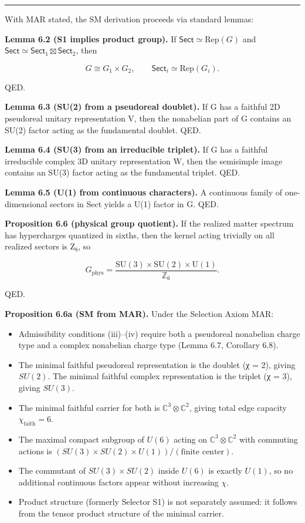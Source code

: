 \begin{center}\rule{0.5\linewidth}{0.5pt}\end{center}

With MAR stated, the SM derivation proceeds via standard lemmas:

\textbf{Lemma 6.2 (S1 implies product group).} If \(\mathsf{Sect} \simeq \mathrm{Rep}(G)\) and \(\mathsf{Sect} \simeq \mathsf{Sect}_1 \boxtimes \mathsf{Sect}_2\), then

\[
G \cong G_1 \times G_2,
\qquad
\mathsf{Sect}_i \simeq \mathrm{Rep}(G_i).
\]

QED.

\textbf{Lemma 6.3 (SU(2) from a pseudoreal doublet).} If G has a faithful 2D pseudoreal unitary representation V, then the nonabelian part of G contains an SU(2) factor acting as the fundamental doublet. QED.

\textbf{Lemma 6.4 (SU(3) from an irreducible triplet).} If G has a faithful irreducible complex 3D unitary representation W, then the semisimple image contains an SU(3) factor acting as the fundamental triplet. QED.

\textbf{Lemma 6.5 (U(1) from continuous characters).} A continuous family of one-dimensional sectors in Sect yields a U(1) factor in G. QED.

\textbf{Proposition 6.6 (physical group quotient).} If the realized matter spectrum has hypercharges quantized in sixths, then the kernel acting trivially on all realized sectors is Z₆, so

\[
G_{\mathrm{phys}} = \frac{\mathrm{SU}(3)\times \mathrm{SU}(2)\times \mathrm{U}(1)}{\mathbb Z_6}.
\]

QED.

\textbf{Proposition 6.6a (SM from MAR).} Under the Selection Axiom MAR:

\begin{itemize}
\tightlist
\item
  Admissibility conditions (iii)--(iv) require both a pseudoreal nonabelian charge type and a complex nonabelian charge type (Lemma 6.7, Corollary 6.8).
\item
  The minimal faithful pseudoreal representation is the doublet (χ = 2), giving \(SU(2)\). The minimal faithful complex representation is the triplet (χ = 3), giving \(SU(3)\).
\item
  The minimal faithful carrier for both is \(\mathbb{C}^3 \otimes \mathbb{C}^2\), giving total edge capacity \(\chi_{\mathrm{faith}} = 6\).
\item
  The maximal compact subgroup of \(U(6)\) acting on \(\mathbb{C}^3 \otimes \mathbb{C}^2\) with commuting actions is \((SU(3) \times SU(2) \times U(1))/(\text{finite center})\).
\item
  The commutant of \(SU(3) \times SU(2)\) inside \(U(6)\) is exactly \(U(1)\), so no additional continuous factors appear without increasing \(\chi\).
\item
  Product structure (formerly Selector S1) is not separately assumed: it follows from the tensor product structure of the minimal carrier.
\end{itemize}

